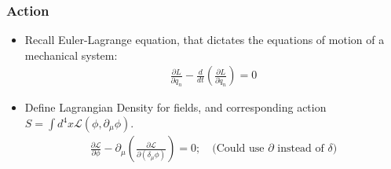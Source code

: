 \subsubsection{Action}
\begin{itemize}
    \item Recall Euler-Lagrange equation, that dictates the equations of motion of a mechanical system: \cite{wells}
        \begin{equation}\begin{split}
            \frac{\partial L}{\partial q_n}-\frac{d}{dt}\left(\frac{\partial L}{\partial\dot{q}_n}\right)=0
        \end{split}\end{equation}
    \item Define Lagrangian Density for fields, and corresponding action $S=\int d^4x\mathcal{L}(\phi,\partial_\mu\phi)$. \cite{wells}
        \begin{equation}\begin{split}
            \frac{\partial\mathcal{L}}{\partial\phi}-\partial_\mu\left(\frac{\partial\mathcal{L}}{\partial(\delta_\mu\phi)}\right)=0; \quad\text{(Could use $\partial$ instead of $\delta$)}
        \end{split}\end{equation}
\end{itemize}

